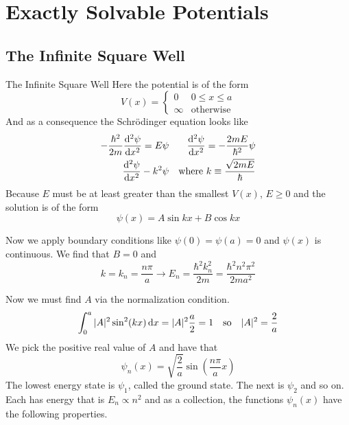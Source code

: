 \section[Potentials]{Exactly Solvable Potentials}

\subsection[Infinite Well]{The Infinite Square Well}

\begin{frame}{The Infinite Square Well}
	Here the potential is of the form
	\[
		V(x) = \begin{cases}
			0      & 0 \leq x \leq a  \\
			\infty & \text{otherwise}
		\end{cases}
	\]
	And as a consequence the Schrödinger equation looks like
	\begin{align*}
		-\frac{\hbar^2}{2m} \dv[2]{\psi}{x} = E \psi &  & \dv[2]{\psi}{x} = -\frac{2mE}{\hbar^2 } \psi    \\
		\dv[2]{\psi}{x} -k^2 \psi                    &  & \text{where } k \equiv \frac{\sqrt{2mE}}{\hbar}
	\end{align*}
	Because $E$ must be at least greater than the smallest $V(x)$, $E\ge 0$ and the solution is of the form
	$$ \psi(x) = A \sin kx + B \cos kx$$

	Now we apply boundary conditions  like $\psi(0) = \psi(a) = 0$ and $\psi(x)$ is continuous. We find that $B = 0$ and
	$$ \boxed{k = k_n = \frac{n \pi}{a} \to E_n = \frac{\hbar^2 k_n^2}{2m} = \frac{\hbar^2 n^2 \pi^2}{2ma^2}} $$

\end{frame}

\begin{frame}
	Now we must find $A$ via the normalization condition.
	$$ \int_0^a |A|^2 \sin[2](kx) \dd{x} = |A|^2 \frac a2 = 1 \qq{so} |A|^2 = \frac 2a$$ We pick the positive real value of $A$ and have that
	$$ \psi_n(x) = \sqrt{\frac{2}{a}} \sin(\frac{n \pi}{a}x)$$
	The lowest energy state is $\psi_1$, called the ground state. The next is $\psi_2$ and so on. Each has energy that is $E_n \propto n^2$ and as a collection, the functions $\psi_n(x)$ have the following properties.

\end{frame}

